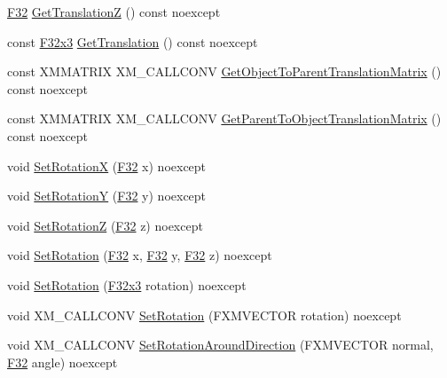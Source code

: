 \begin{DoxyCompactItemize}
\item 
\hyperlink{namespacemage_aa97e833b45f06d60a0a9c4fc22ae02c0}{F32} \hyperlink{classmage_1_1_transform_node_a2c34908570c0d84f9312462a0cc255c7}{Get\+TranslationZ} () const noexcept
\item 
const \hyperlink{namespacemage_a73fbe0da4b8d5bc156bb8453e5b63a17}{F32x3} \hyperlink{classmage_1_1_transform_node_a5964010e43daef3dfba42621abc12e46}{Get\+Translation} () const noexcept
\item 
const X\+M\+M\+A\+T\+R\+IX X\+M\+\_\+\+C\+A\+L\+L\+C\+O\+NV \hyperlink{classmage_1_1_transform_node_a2695b6c661677eb8f019e7b0a538c4de}{Get\+Object\+To\+Parent\+Translation\+Matrix} () const noexcept
\item 
const X\+M\+M\+A\+T\+R\+IX X\+M\+\_\+\+C\+A\+L\+L\+C\+O\+NV \hyperlink{classmage_1_1_transform_node_ae88b4133e4920cb87b8ce32fe083bf17}{Get\+Parent\+To\+Object\+Translation\+Matrix} () const noexcept
\item 
void \hyperlink{classmage_1_1_transform_node_a28fca8112e0e48ba6c6a630c4429b377}{Set\+RotationX} (\hyperlink{namespacemage_aa97e833b45f06d60a0a9c4fc22ae02c0}{F32} x) noexcept
\item 
void \hyperlink{classmage_1_1_transform_node_a131c7b47c7ee2268c49a7fbad26c2405}{Set\+RotationY} (\hyperlink{namespacemage_aa97e833b45f06d60a0a9c4fc22ae02c0}{F32} y) noexcept
\item 
void \hyperlink{classmage_1_1_transform_node_aaa6413a6afa54e1935efd8137ebe4d42}{Set\+RotationZ} (\hyperlink{namespacemage_aa97e833b45f06d60a0a9c4fc22ae02c0}{F32} z) noexcept
\item 
void \hyperlink{classmage_1_1_transform_node_ac87418dfcbc516056657a5ebe8d02ed6}{Set\+Rotation} (\hyperlink{namespacemage_aa97e833b45f06d60a0a9c4fc22ae02c0}{F32} x, \hyperlink{namespacemage_aa97e833b45f06d60a0a9c4fc22ae02c0}{F32} y, \hyperlink{namespacemage_aa97e833b45f06d60a0a9c4fc22ae02c0}{F32} z) noexcept
\item 
void \hyperlink{classmage_1_1_transform_node_aa90686cd9f26633e598e2d66d2f6e107}{Set\+Rotation} (\hyperlink{namespacemage_a73fbe0da4b8d5bc156bb8453e5b63a17}{F32x3} rotation) noexcept
\item 
void X\+M\+\_\+\+C\+A\+L\+L\+C\+O\+NV \hyperlink{classmage_1_1_transform_node_a354d20ffedec33173a598718677f7a74}{Set\+Rotation} (F\+X\+M\+V\+E\+C\+T\+OR rotation) noexcept
\item 
void X\+M\+\_\+\+C\+A\+L\+L\+C\+O\+NV \hyperlink{classmage_1_1_transform_node_a05740ca63e180ff694baa549b70ad67c}{Set\+Rotation\+Around\+Direction} (F\+X\+M\+V\+E\+C\+T\+OR normal, \hyperlink{namespacemage_aa97e833b45f06d60a0a9c4fc22ae02c0}{F32} angle) noexcept

\end{DoxyCompactItemize}
